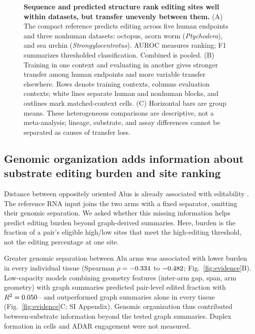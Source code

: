 \documentclass[9pt,twocolumn,twoside]{pnas-new}
\begin{document}
\begin{figure}[t!]
\centering

\caption{\textbf{Sequence and predicted structure rank editing sites well within datasets, but transfer unevenly between them.} (A) The compact reference predicts editing across five human endpoints and three nonhuman datasets: octopus, acorn worm (\textit{Ptychodera}), and sea urchin (\textit{Strongylocentrotus}). AUROC measures ranking; F1 summarizes thresholded classification. Combined is pooled. (B) Training in one context and evaluating in another gives stronger transfer among human endpoints and more variable transfer elsewhere. Rows denote training contexts, columns evaluation contexts; white lines separate human and nonhuman blocks, and outlines mark matched-context cells. (C) Horizontal bars are group means. These heterogeneous comparisons are descriptive, not a meta-analysis; lineage, substrate, and assay differences cannot be separated as causes of transfer loss.}
\label{fig:scope}
\end{figure}

\subsection*{Genomic organization adds information about substrate editing burden and site ranking}

Distance between oppositely oriented Alus is already associated with editability \cite{Bazak2014Editability}. The reference RNA input joins the two arms with a fixed separator, omitting their genomic separation. We asked whether this missing information helps predict editing burden beyond graph-derived summaries. Here, burden is the fraction of a pair's eligible high/low sites that meet the high-editing threshold, not the editing percentage at one site.

Greater genomic separation between Alu arms was associated with lower burden in every individual tissue (Spearman $\rho=-0.334{}$ to $-0.482{}$; Fig.~\ref{fig:evidence}B). Low-capacity models combining geometry features (inter-arm gap, span, arm geometry) with graph summaries predicted pair-level edited fraction with $R^2=0.050{}$--\LiverEngagementCombinedGeometryRSquared{} and outperformed graph summaries alone in every tissue (Fig.~\ref{fig:evidence}C; SI Appendix). Genomic organization thus contributed between-substrate information beyond the tested graph summaries. Duplex formation in cells and ADAR engagement were not measured.
\end{document}
